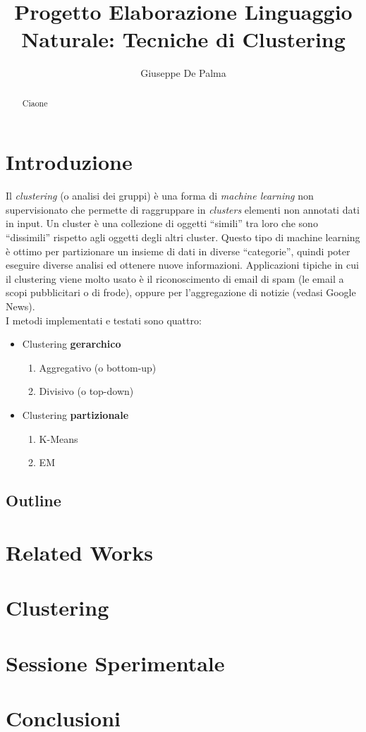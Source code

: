 \documentclass{llncs}
\author{Giuseppe De Palma}
\title{Progetto Elaborazione Linguaggio Naturale: Tecniche di Clustering}
\institute{Alma Mater Studiorum - Università di Bologna \\
	\email{giuseppe.depalma@studio.unibo.it}\\
	\email{Matricola: 854846}
}
\newcommand{\acapo}{\vspace{0.5\baselineskip}\\}
\begin{document}
    \maketitle
	
	\begin{abstract}
		Ciaone
	\end{abstract}
	   
	\section{Introduzione}
	Il \textit{clustering} (o analisi dei gruppi) è una forma di \textit{machine learning} non supervisionato che permette di raggruppare in \textit{clusters} elementi non annotati
	dati in input. Un cluster è una collezione di oggetti ``simili'' tra loro che sono ``dissimili'' rispetto agli oggetti degli altri cluster. Questo tipo di machine learning è
	ottimo per partizionare un insieme di dati in diverse ``categorie'', quindi poter eseguire diverse analisi ed ottenere nuove informazioni.
	Applicazioni tipiche in cui il clustering viene molto usato è il riconoscimento di email di spam (le email a scopi pubblicitari o di frode), oppure per l'aggregazione di notizie (vedasi Google News).
	\acapo
	I metodi implementati e testati sono quattro:
	\begin{itemize}
		\item Clustering \textbf{gerarchico}
		\begin{enumerate}
			\item Aggregativo (o bottom-up)
			\item Divisivo (o top-down)
		\end{enumerate}

		\item Clustering \textbf{partizionale}
		\begin{enumerate}
			\item K-Means
			\item EM
		\end{enumerate}
	\end{itemize}
    \subsection{Outline}
    \section{Related Works}
    \section{Clustering}
    \section{Sessione Sperimentale}
    \section{Conclusioni}
    
\end{document}
